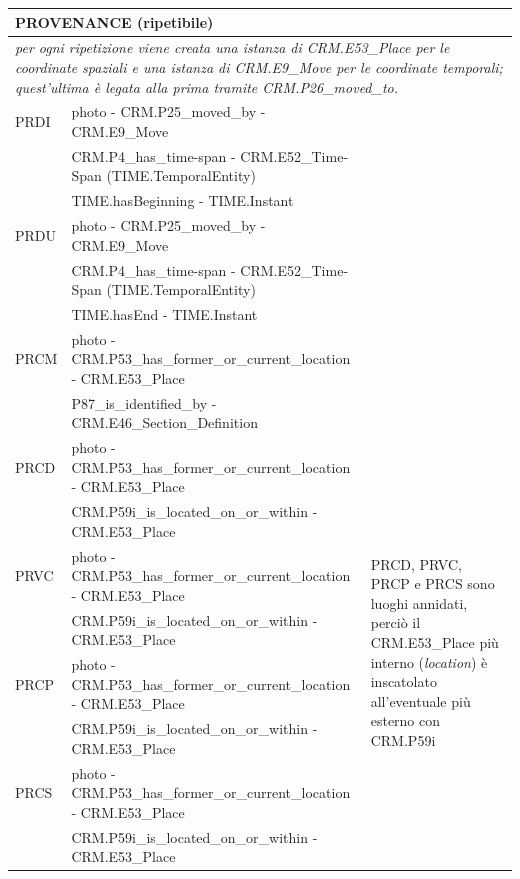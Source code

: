 \begin{center}
\begin{longtable}{ | p{1cm} | p{8cm} | p{3cm} | }
  \multicolumn{3}{|l|}{\cellcolor{lightcyan}PROVENANCE (ripetibile)}\\ \hline
  \multicolumn{3}{|p{12cm}|}{\emph{per ogni ripetizione viene creata una istanza di CRM.E53\_Place per le coordinate spaziali e una istanza di CRM.E9\_Move per le coordinate temporali; quest'ultima è legata alla prima tramite CRM.P26\_moved\_to.}}\\ \hline
  PRDI &  photo - CRM.P25\_moved\_by - CRM.E9\_Move & \\
   & CRM.P4\_has\_time-span - CRM.E52\_Time-Span (TIME.TemporalEntity) & \\
   & TIME.hasBeginning - TIME.Instant & \\ \hline
  PRDU &  photo - CRM.P25\_moved\_by - CRM.E9\_Move & \\
   & CRM.P4\_has\_time-span - CRM.E52\_Time-Span (TIME.TemporalEntity) & \\
   & TIME.hasEnd - TIME.Instant & \\ \hline
  PRCM &  photo - CRM.P53\_has\_former\_or\_current\_location - CRM.E53\_Place & \\
   & P87\_is\_identified\_by - CRM.E46\_Section\_Definition & \\ \hline
  PRCD &  photo - CRM.P53\_has\_former\_or\_current\_location - CRM.E53\_Place & \multirow{8}{3cm}{PRCD, PRVC, PRCP e PRCS sono luoghi annidati, perciò il CRM.E53\_Place più interno (\emph{location}) è inscatolato all'eventuale più esterno con CRM.P59i}\\
    & CRM.P59i\_is\_located\_on\_or\_within - CRM.E53\_Place & \\ \cline{1-2}
  PRVC &  photo - CRM.P53\_has\_former\_or\_current\_location - CRM.E53\_Place & \\
   & CRM.P59i\_is\_located\_on\_or\_within - CRM.E53\_Place & \\ \cline{1-2}
  PRCP &  photo - CRM.P53\_has\_former\_or\_current\_location - CRM.E53\_Place & \\
   & CRM.P59i\_is\_located\_on\_or\_within - CRM.E53\_Place & \\ \cline{1-2}
  PRCS &  photo - CRM.P53\_has\_former\_or\_current\_location - CRM.E53\_Place & \\
   & CRM.P59i\_is\_located\_on\_or\_within - CRM.E53\_Place & \\ \hline


\end{longtable}
\end{center}
